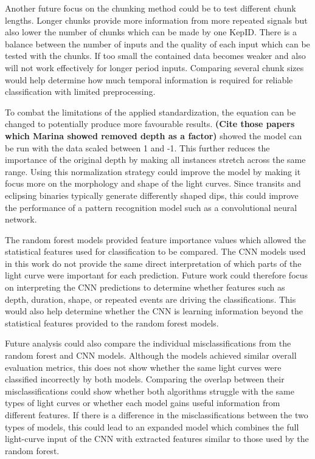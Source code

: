 Another future focus on the chunking method could be to test different chunk lengths. Longer chunks provide more information from more repeated signals but also lower the number of chunks which can be made by one KepID. There is a balance between the number of inputs and the quality of each input which can be tested with the chunks. If too small the contained data becomes weaker and also will not work effectively for longer period inputs. Comparing several chunk sizes would help determine how much temporal information is required for reliable classification with limited preprocessing.

To combat the limitations of the applied standardization, the equation can be changed to potentially produce more favourable results. \textbf{(Cite those papers which Marina showed removed depth as a factor)} showed the model can be run with the data scaled between 1 and -1. This further reduces the importance of the original depth by making all instances stretch across the same range. Using this normalization strategy could improve the model by making it focus more on the morphology and shape of the light curves. Since transits and eclipsing binaries typically generate differently shaped dips, this could improve the performance of a pattern recognition model such as a convolutional neural network.

The random forest models provided feature importance values which allowed the statistical features used for classification to be compared. The CNN models used in this work do not provide the same direct interpretation of which parts of the light curve were important for each prediction. Future work could therefore focus on interpreting the CNN predictions to determine whether features such as depth, duration, shape, or repeated events are driving the classifications. This would also help determine whether the CNN is learning information beyond the statistical features provided to the random forest models.

Future analysis could also compare the individual misclassifications from the random forest and CNN models. Although the models achieved similar overall evaluation metrics, this does not show whether the same light curves were classified incorrectly by both models. Comparing the overlap between their misclassifications could show whether both algorithms struggle with the same types of light curves or whether each model gains useful information from different features. If there is a difference in the misclassifications between the two types of models, this could lead to an expanded model which combines the full light-curve input of the CNN with extracted features similar to those used by the random forest.

